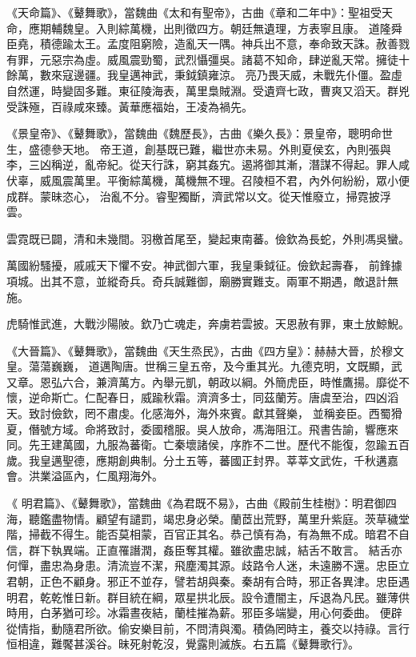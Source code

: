\begin{pinyinscope}
 《天命篇》、《鼙舞歌》，當魏曲《太和有聖帝》，古曲《章和二年中》：聖祖受天命，應期輔魏皇。入則綜萬機，出則徵四方。朝廷無遺理，方表寧且康。
 道隆舜臣堯，積德踰太王。孟度阻窮險，造亂天一隅。神兵出不意，奉命致天誅。赦善戮有罪，元惡宗為虛。威風震勁蜀，武烈懾彊吳。諸葛不知命，肆逆亂天常。擁徒十餘萬，數來寇邊疆。我皇邁神武，秉鉞鎮雍涼。
 亮乃畏天威，未戰先仆僵。盈虛自然運，時變固多難。東征陵海表，萬里梟賊淵。受遺齊七政，曹爽又滔天。群兇受誅殛，百祿咸來臻。黃華應福始，王凌為禍先。



 《景皇帝》、《鼙舞歌》，當魏曲《魏歷長》，古曲《樂久長》：景皇帝，聰明命世生，盛德參天地。
 帝王道，創基既已難，繼世亦未易。外則夏侯玄，內則張與李，三凶稱逆，亂帝紀。從天行誅，窮其姦宄。遏將御其漸，潛謀不得起。罪人咸伏辜，威風震萬里。平衡綜萬機，萬機無不理。召陵桓不君，內外何紛紛，眾小便成群。蒙昧恣心，
 治亂不分。睿聖獨斷，濟武常以文。從天惟廢立，掃霓披浮雲。



 雲霓既已闢，清和未幾間。羽檄首尾至，變起東南蕃。儉欽為長蛇，外則馮吳蠻。



 萬國紛騷擾，戚戚天下懼不安。神武御六軍，我皇秉鉞征。儉欽起壽春，
 前鋒據項城。出其不意，並縱奇兵。奇兵誠難御，廟勝實難支。兩軍不期遇，敵退計無施。



 虎騎惟武進，大戰沙陽陂。欽乃亡魂走，奔虜若雲披。天恩赦有罪，東土放鯨鯢。



 《大晉篇》、《鼙舞歌》，當魏曲《天生烝民》，古曲《四方皇》：赫赫大晉，於穆文皇。蕩蕩巍巍，
 道邁陶唐。世稱三皇五帝，及今重其光。九德克明，文既顯，武又章。恩弘六合，兼濟萬方。內舉元凱，朝政以綱。外簡虎臣，時惟鷹揚。靡從不懷，逆命斯亡。仁配春日，威踰秋霜。濟濟多士，同茲蘭芳。唐虞至治，四凶滔天。致討儉欽，罔不肅虔。化感海外，海外來賓。獻其聲樂，
 並稱妾臣。西蜀猾夏，僭號方域。命將致討，委國稽服。吳人放命，馮海阻江。飛書告諭，響應來同。先王建萬國，九服為蕃衛。亡秦壞諸侯，序胙不二世。歷代不能復，忽踰五百歲。我皇邁聖德，應期創典制。分土五等，蕃國正封界。莘莘文武佐，千秋遘嘉會。洪業溢區內，仁風翔海外。



 《
 明君篇》、《鼙舞歌》，當魏曲《為君既不易》，古曲《殿前生桂樹》：明君御四海，聽鑑盡物情。顧望有譴罰，竭忠身必榮。蘭茝出荒野，萬里升紫庭。茨草穢堂階，掃截不得生。能否莫相蒙，百官正其名。恭己慎有為，有為無不成。暗君不自信，群下執異端。正直罹譖潤，姦臣奪其權。雖欲盡忠誠，結舌不敢言。
 結舌亦何憚，盡忠為身患。清流豈不潔，飛塵濁其源。歧路令人迷，未遠勝不還。忠臣立君朝，正色不顧身。邪正不並存，譬若胡與秦。秦胡有合時，邪正各異津。忠臣遇明君，乾乾惟日新。群目統在綱，眾星拱北辰。設令遭闇主，斥退為凡民。雖薄供時用，白茅猶可珍。冰霜晝夜結，蘭桂摧為薪。邪臣多端變，用心何委曲。
 便辟從情指，動隨君所欲。偷安樂目前，不問清與濁。積偽罔時主，養交以持祿。言行恒相違，難饜甚溪谷。昧死射乾沒，覺露則滅族。右五篇《鼙舞歌行》。




\end{pinyinscope}
